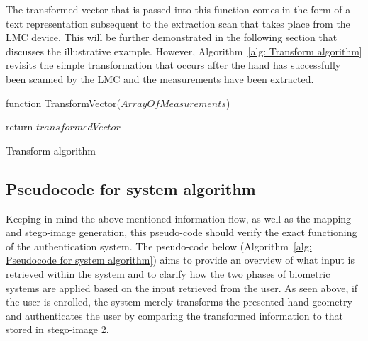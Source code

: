 The transformed vector that is passed into this function comes in the form of a text representation subsequent to the extraction scan that takes place from the LMC device. This will be further demonstrated in the following section that discusses the illustrative example. However, Algorithm~\ref{alg: Transform algorithm} revisits the simple transformation that occurs after the hand has successfully been scanned by the LMC and the measurements have been extracted. 


\begin{algorithm}
     
     \underline{function TransformVector}($ArrayOfMeasurements$)\;
     
     
     return $transformedVector$\;
     \caption{Transform algorithm}
     \label{alg: Transform algorithm}
     
\end{algorithm}








\subsection{Pseudocode for system algorithm}

Keeping in mind the above-mentioned information flow, as well as the mapping and stego-image generation, this pseudo-code should verify the exact functioning of the authentication system.
The pseudo-code below (Algorithm~\ref{alg: Pseudocode for system algorithm}) aims to provide an overview of what input is retrieved within the system and to clarify how the two phases of biometric systems are applied based on the input retrieved from the user. As seen above, if the user is enrolled, the system merely transforms the presented hand geometry and authenticates the user by comparing the transformed information to that stored in stego-image 2.

